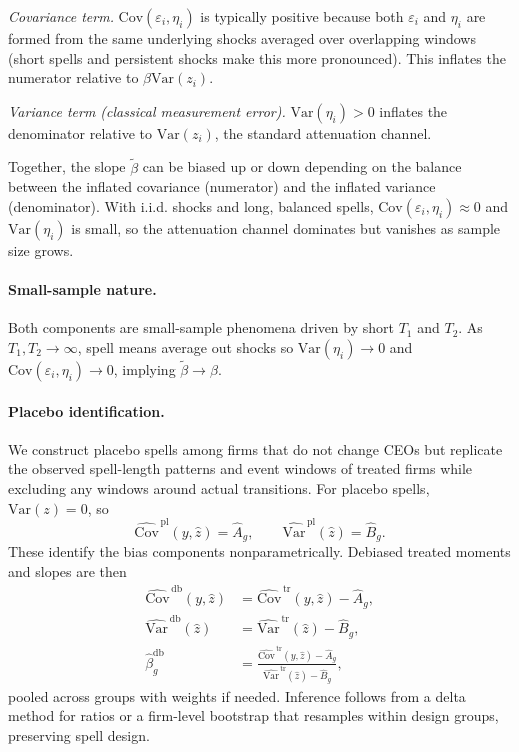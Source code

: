 \documentclass[11pt,a4paper]{article}
\newcommand{\Var}{\text{Var}}
\newcommand{\Cov}{\text{Cov}}
\begin{document}
\textit{Covariance term.} $\Cov(\varepsilon_i,\eta_i)$ is typically positive because both $\varepsilon_i$ and $\eta_i$ are formed from the same underlying shocks averaged over overlapping windows (short spells and persistent shocks make this more pronounced). This inflates the numerator relative to $\beta\Var(z_i)$.

\textit{Variance term (classical measurement error).} $\Var(\eta_i)>0$ inflates the denominator relative to $\Var(z_i)$, the standard attenuation channel.

Together, the slope $\tilde\beta$ can be biased up or down depending on the balance between the inflated covariance (numerator) and the inflated variance (denominator). With i.i.d. shocks and long, balanced spells, $\Cov(\varepsilon_i,\eta_i)\approx 0$ and $\Var(\eta_i)$ is small, so the attenuation channel dominates but vanishes as sample size grows.

\paragraph{Small-sample nature.} Both components are small-sample phenomena driven by short $T_1$ and $T_2$. As $T_1,T_2\to\infty$, spell means average out shocks so $\Var(\eta_i)\to 0$ and $\Cov(\varepsilon_i,\eta_i)\to 0$, implying $\tilde\beta\to\beta$.

\paragraph{Placebo identification.} We construct placebo spells among firms that do not change CEOs but replicate the observed spell-length patterns and event windows of treated firms while excluding any windows around actual transitions. For placebo spells, $\Var(z)=0$, so
\begin{equation}
\widehat{\Cov}^{\,\text{pl}}(y,\hat z)=\hat A_g,\qquad \widehat{\Var}^{\,\text{pl}}(\hat z)=\hat B_g.
\end{equation}
These identify the bias components nonparametrically. Debiased treated moments and slopes are then
\begin{align}
\widehat{\Cov}^{\,\text{db}}(y,\hat z) &= \widehat{\Cov}^{\,\text{tr}}(y,\hat z) - \hat A_g,\\
\widehat{\Var}^{\,\text{db}}(\hat z) &= \widehat{\Var}^{\,\text{tr}}(\hat z) - \hat B_g,\\
\hat\beta^{\text{db}}_g &= \frac{\widehat{\Cov}^{\,\text{tr}}(y,\hat z)-\hat A_g}{\widehat{\Var}^{\,\text{tr}}(\hat z)-\hat B_g},
\end{align}
pooled across groups with weights if needed. Inference follows from a delta method for ratios or a firm-level bootstrap that resamples within design groups, preserving spell design.
\end{document}
